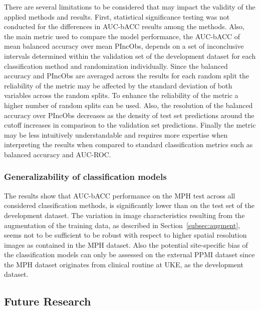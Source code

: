 There are several limitations to be considered that may impact the validity of the applied methods and results.
First, statistical significance testing was not conducted for the differences in AUC-bACC results among the methods.
Also, the main metric used to compare the model performance, the AUC-bACC of mean balanced accuracy over mean PIncObs, 
depends on a set of inconclusive intervals determined within the validation set of the development dataset 
for each classification method and randomization individually.
Since the balanced accuracy and PIncObs are averaged across the results for each random split 
the reliability of the metric may be affected by the standard deviation of both variables across the random splits.
To enhance the reliability of the metric a higher number of random splits can be used.
Also, the resolution of the balanced accuracy over PIncObs decreases as the density of test set 
predictions around the cutoff increases in comparison to the validation set predictions.
Finally the metric may be less intuitively understandable and requires more expertise when interpreting the results
when compared to standard classification metrics such as balanced accuracy and AUC-ROC.


\subsubsection{Generalizability of classification models}

The results show that AUC-bACC performance on the MPH test across all considered classification methods, 
is significantly lower than on the test set of the development dataset.
The variation in image characteristics resulting from the augmentation of the training data,
as described in Section~\ref{subsec:augment}, seems not to be sufficient to be robust 
with respect to higher spatial resolution images as contained in the MPH dataset.
Also the potential site-specific bias of the classification models can only be assessed 
on the external PPMI dataset 
since the MPH dataset originates from clinical routine at UKE, as the development dataset.


\subsection{Future Research}


